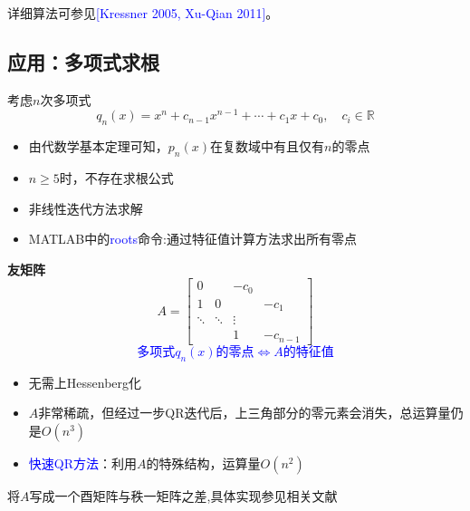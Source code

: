 \documentclass[12pt,a4paper]{article}
\begin{document}
详细算法可参见\textcolor{blue}{[Kressner 2005, Xu-Qian 2011]}。
\subsection{应用：多项式求根}
考虑$n$次多项式$$
q_{n}(x)=x^{n}+c_{n-1} x^{n-1}+\cdots+c_{1} x+c_{0}, \quad c_{i} \in \mathbb{R}
$$
\begin{itemize}
	\item 由代数学基本定理可知，$p_n(x)$在复数域中有且仅有$n$的零点
	\item $n\geq 5$时，不存在求根公式
	\item 非线性迭代方法求解
	\item MATLAB中的\textcolor{blue}{roots}命令:通过特征值计算方法求出所有零点
\end{itemize}
\textbf{友矩阵}
$$
A=\left[\begin{array}{cccc}{0} & {} & {-c_{0}} \\ {1} & {0} & {} & {-c_{1}} \\ {\ddots} & {\ddots} & {\vdots} \\ {} & {} & {1} & {-c_{n-1}}\end{array}\right]
$$
\textcolor{blue}{$$
\text{多项式}q_n(x) \text{的零点}\Longleftrightarrow A\text{的特征值}
$$}
\begin{itemize}
	\item 无需上Hessenberg化
	\item $A$非常稀疏，但经过一步QR迭代后，上三角部分的零元素会消失，总运算量仍是$O\left(n^{3}\right)$
	\item \textcolor{blue}{快速QR方法}：利用$A$的特殊结构，运算量$O\left(n^{2}\right)$
\end{itemize}
将$A$写成一个酉矩阵与秩一矩阵之差,具体实现参见相关文献
\end{document}
